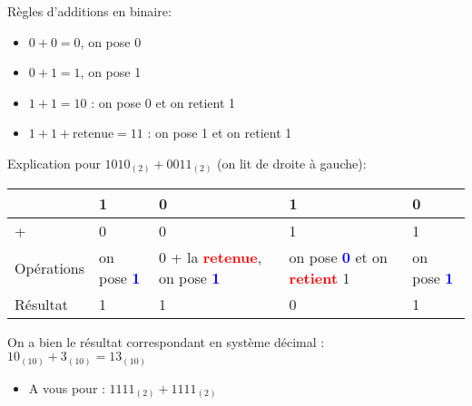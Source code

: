 
Règles d'additions en binaire:
\begin{itemize}
  \item$0 + 0 = 0$, on pose 0
  \item$0 + 1 = 1$, on pose 1
  \item$1 + 1 = 10$ : on pose 0 et on retient 1
  \item$1 + 1 + \text{retenue} =11$ : on pose 1 et on retient 1
\end{itemize}

Explication pour \textbf{$1010_{(2)} + 0011_{(2)}$} (on lit de droite à gauche):

\vspace{0.2cm}

\begin{tabular}{l|p{2.5cm}|p{3cm}|p{3cm}|p{2.5cm}}
	&	1	&0	&1	&0\\
\hline
+	&	0	&0	&1	&1\\
\hline
\hline
Opérations	&	on pose \textcolor{blue}{\textbf{1}}&0 + la \textcolor{red}{\textbf{retenue}}, on pose \textcolor{blue}{\textbf{1}} &on pose \textcolor{blue}{\textbf{0}} et on \textcolor{red}{\textbf{retient}} 1&on pose \textcolor{blue}{\textbf{1}}\\
\hline
Résultat	&1	&1	&0	&1	\\
\end{tabular}

\vspace{0.2cm}
On a bien le résultat correspondant en système décimal : $10_{(10)} + 3_{(10)} = 13_{(10)}$

\begin{itemize}
  \item A vous pour : $1111_{(2)} + 1111_{(2)}$
\end{itemize}

